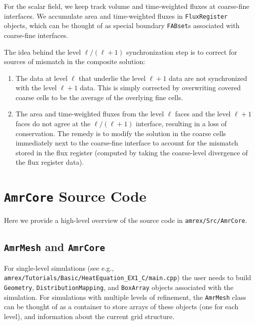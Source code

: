 For the scalar field, we keep track volume and time-weighted fluxes at coarse-fine interfaces.
We accumulate area and time-weighted fluxes in {\tt FluxRegister} objects, which can be
thought of as special boundary {\tt FABset}s associated with coarse-fine interfaces.

The idea behind the level $\ell/(\ell+1)$ synchronization step is to correct for sources of mismatch in the composite solution:
\begin{enumerate}
\item The data at level $\ell$ that underlie the level  $\ell+1$ data are not synchronized with the level $\ell+1$ data.
This is simply corrected by overwriting covered coarse cells to be the average of the overlying fine cells.
\item The area and time-weighted fluxes from the level $\ell$ faces and the level $\ell+1$ faces
do not agree at the $\ell/(\ell+1)$ interface, resulting in a loss of conservation.  
The remedy is to modify the solution in the coarse cells immediately next to the coarse-fine interface
to account for the mismatch stored in the flux register (computed by taking the coarse-level divergence of the
flux register data).
\end{enumerate}

\section{{\tt AmrCore} Source Code}
Here we provide a high-level overview of the source code in {\tt amrex/Src/AmrCore}.

\subsection{{\tt AmrMesh} and {\tt AmrCore}}

For single-level simulations
(see e.g., {\tt amrex/Tutorials/Basic/HeatEquation\_EX1\_C/main.cpp})
the user needs to build {\tt Geometry}, {\tt DistributionMapping},
and {\tt BoxArray} objects associated with the simulation.  For simulations
with multiple levels of refinement, the {\tt AmrMesh} class can be thought
of as a container to store arrays of these objects (one for each level), and
information about the current grid structure.

